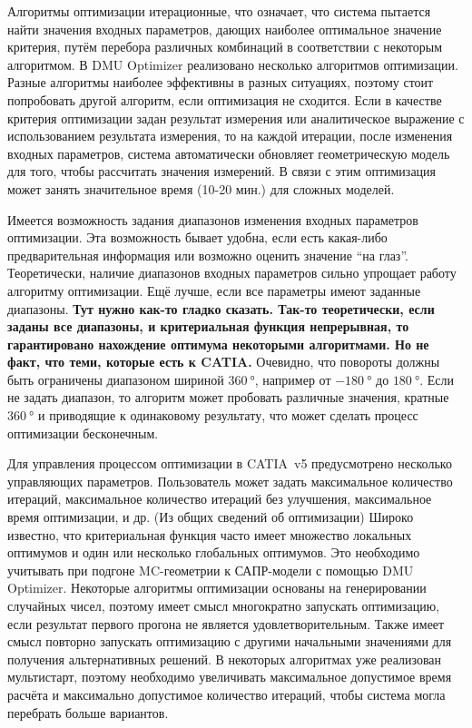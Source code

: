 Алгоритмы оптимизации итерационные, что означает, что система пытается найти значения входных параметров, дающих наиболее оптимальное значение критерия, путём перебора различных комбинаций в соответствии с некоторым алгоритмом. В DMU Optimizer реализовано несколько алгоритмов оптимизации. Разные алгоритмы наиболее эффективны в разных ситуациях, поэтому стоит попробовать другой алгоритм, если оптимизация не сходится. Если в качестве критерия оптимизации задан результат измерения или аналитическое выражение с использованием результата измерения, то на каждой итерации, после изменения входных параметров, система автоматически обновляет геометрическую модель для того, чтобы рассчитать значения измерений. В связи с этим оптимизация может занять значительное время (10-20 мин.) для сложных моделей.

Имеется возможность задания диапазонов изменения входных параметров оптимизации. Эта возможность бывает удобна, если есть какая-либо предварительная информация или возможно оценить значение ``на глаз''.
\todo Теоретически, наличие диапазонов входных параметров сильно упрощает работу алгоритму оптимизации. Ещё лучше, если все параметры имеют заданные диапазоны. \todo \textbf{Тут нужно как-то гладко сказать. Так-то теоретически, если заданы все диапазоны, и критериальная функция непрерывная, то гарантировано нахождение оптимума некоторыми алгоритмами. Но не факт, что теми, которые есть к CATIA.}
Очевидно, что повороты должны быть ограничены диапазоном шириной $\SI{360}{\degree}$, например от $\SI{-180}{\degree}$ до $\SI{180}{\degree}$. Если не задать диапазон, то алгоритм может пробовать различные значения, кратные $\SI{360}{\degree}$ и приводящие к одинаковому результату, что может сделать процесс оптимизации бесконечным.

Для управления процессом оптимизации в CATIA~v5 предусмотрено несколько управляющих параметров. Пользователь может задать максимальное количество итераций, максимальное количество итераций без улучшения, максимальное время оптимизации, и др. \todo
(Из общих сведений об оптимизации)
Широко известно, что критериальная функция часто имеет множество локальных оптимумов и один или несколько глобальных оптимумов. Это необходимо учитывать при подгоне MC-геометрии к САПР-модели с помощью DMU Optimizer. Некоторые алгоритмы оптимизации основаны на генерировании случайных чисел, поэтому имеет смысл многократно запускать оптимизацию, если результат первого прогона не является удовлетворительным. Также имеет смысл повторно запускать оптимизацию с другими начальными значениями для получения альтернативных решений. В некоторых алгоритмах уже реализован мультистарт, поэтому необходимо увеличивать максимальное допустимое время расчёта и максимально допустимое количество итераций, чтобы система могла перебрать больше вариантов.

